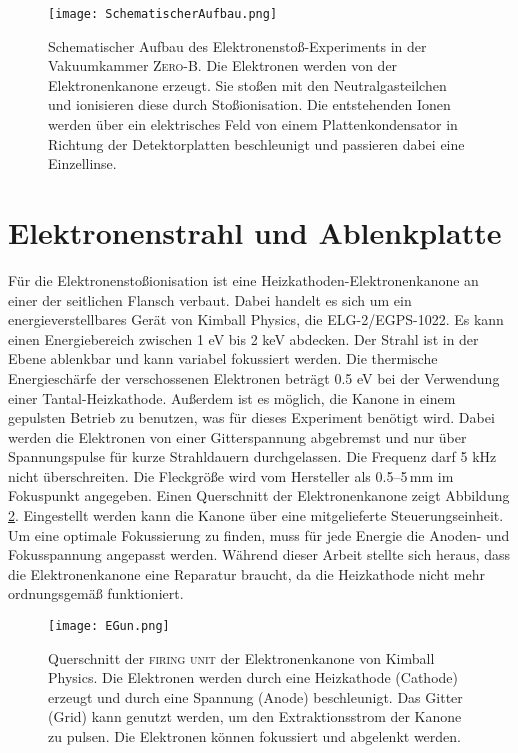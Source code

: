 \begin{landscape}
    \begin{figure}
        \centering
        \vspace*{-1cm}\hspace*{-1cm}\texttt{[image: SchematischerAufbau.png]}
        \caption[Schematischer Aufbau des Experiments]{Schematischer Aufbau des Elektronenstoß-Experiments in der Vakuumkammer \textsc{Zero-B}. Die Elektronen werden von der Elektronenkanone erzeugt. Sie stoßen mit den Neutralgasteilchen und ionisieren diese durch Stoßionisation. Die entstehenden Ionen werden über ein elektrisches Feld von einem Plattenkondensator in Richtung der Detektorplatten beschleunigt und passieren dabei eine Einzellinse.}
        \label{fig:Aufbau}
    \end{figure}
\end{landscape}

\section{Elektronenstrahl und Ablenkplatte}
\label{sec:Elektronenstrahl}
Für die Elektronenstoßionisation ist eine Heizkathoden-Elektronenkanone an einer der seitlichen Flansch verbaut. Dabei handelt es sich um ein energieverstellbares Gerät von Kimball Physics, die ELG-2/EGPS-1022. Es kann einen Energiebereich zwischen 1 eV bis 2 keV abdecken. Der Strahl ist in der Ebene ablenkbar und kann variabel fokussiert werden. Die thermische Energieschärfe der verschossenen Elektronen beträgt 0.5 eV bei der Verwendung einer Tantal-Heizkathode. Außerdem ist es möglich, die Kanone in einem gepulsten Betrieb zu benutzen, was für dieses Experiment benötigt wird. Dabei werden die Elektronen von einer Gitterspannung abgebremst und nur über Spannungspulse für kurze Strahldauern durchgelassen. Die Frequenz darf 5 kHz nicht überschreiten. Die Fleckgröße wird vom Hersteller als 0.5--5\,mm im Fokuspunkt angegeben. Einen Querschnitt der Elektronenkanone zeigt Abbildung \ref{fig:EGun}. Eingestellt werden kann die Kanone über eine mitgelieferte Steuerungseinheit. Um eine optimale Fokussierung zu finden, muss für jede Energie die Anoden- und Fokusspannung angepasst werden. Während dieser Arbeit stellte sich heraus, dass die Elektronenkanone eine Reparatur braucht, da die Heizkathode nicht mehr ordnungsgemäß funktioniert.

\begin{figure}
    \centering
    \texttt{[image: EGun.png]}
    \caption[Querschnitt der \textsc{firing unit} der Elektronenkanone]{Querschnitt der \textsc{firing unit} der Elektronenkanone von Kimball Physics. Die Elektronen werden durch eine Heizkathode (Cathode) erzeugt und durch eine Spannung (Anode) beschleunigt. Das Gitter (Grid) kann genutzt werden, um den Extraktionsstrom der Kanone zu pulsen. Die Elektronen können fokussiert und abgelenkt werden.}
    \label{fig:EGun}
\end{figure}

